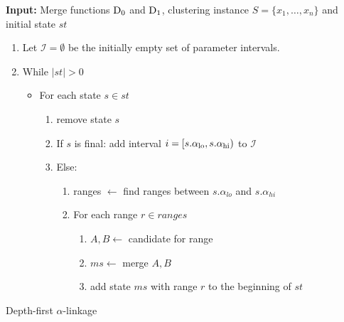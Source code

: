 \begin{algorithm}
    \textbf{Input:} Merge functions $\operatorname{D_{0}}$ and $\operatorname{D_{1}}$, clustering instance $S = \{x_1, \dots, x_n\}$ and initial state $st$
    \begin{enumerate}[nosep, leftmargin=*]
    \item Let $\mathcal{I} = \emptyset$ be the initially empty set of parameter intervals.
    \item While $|st| > 0$
    \begin{itemize}[nosep, leftmargin=*]
        \item For each state $s \in st$
        \begin{enumerate}
            \item remove state $s$\;
            \item If $s$ is final: add interval $i = [s.\alpha_\text{lo}, s.\alpha_\text{hi})$ to $\mathcal{I}$
            \item Else: 
            \begin{enumerate}
                \item ranges $\gets$ find ranges between $s.\alpha_{lo}$ and $s.\alpha_{hi}$
                \item For each range $r \in ranges$
                \begin{enumerate}
                    \item $A, B \gets$ candidate for range
                    \item $ms \gets$ merge $A, B$
                    \item add state $ms$ with range $r$ to the beginning of $st$
                \end{enumerate}
            \end{enumerate}
        \end{enumerate}
    \end{itemize}
    \end{enumerate}
    \caption{Depth-first $\alpha$-linkage}
    \label{alg:alphalinkage3}
\end{algorithm}

